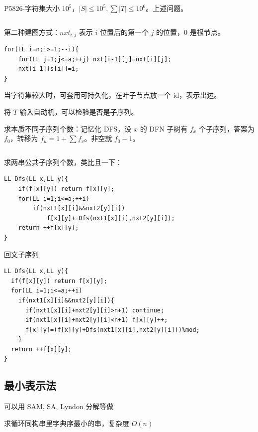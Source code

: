 \documentclass[twocolumn,10pt]{ctexart}
\begin{document}
\begin{notebox}
P5826-字符集大小 $10^5$，$|S|\le10^5,\sum |T|\le 10^6$。上述问题。
\end{notebox}

\inputminted{cpp}{code/p5826_seg_automaton.cpp}

第二种建图方式：$nxt_{i,j}$ 表示 $i$ 位置后的第一个 $j$ 的位置，$0$ 是根节点。

\begin{verbatim}
for(LL i=n;i>=1;--i){
    for(LL j=1;j<=a;++j) nxt[i-1][j]=nxt[i][j];
    nxt[i-1][s[i]]=i;
}
\end{verbatim}

\begin{notebox}
当字符集较大时，可套用可持久化，在叶子节点放一个 id，表示出边。
\end{notebox}

将 $T$ 输入自动机，可以检验是否是子序列。

求本质不同子序列个数：记忆化 DFS，设 $x$ 的 DFN 子树有 $f_x$ 个子序列，答案为 $f_0$，转移为 $f_u=1+\sum f_v$。非空就 $f_0-1$。

\inputminted{cpp}{code/lc940_seg_automaton.cpp}

求两串公共子序列个数，类比且一下：

\begin{verbatim}
LL Dfs(LL x,LL y){
    if(f[x][y]) return f[x][y];
    for(LL i=1;i<=a;++i)
        if(nxt1[x][i]&&nxt2[y][i])
            f[x][y]+=Dfs(nxt1[x][i],nxt2[y][i]);
    return ++f[x][y];
}
\end{verbatim}

回文子序列

\begin{verbatim}
LL Dfs(LL x,LL y){
  if(f[x][y]) return f[x][y];
  for(LL i=1;i<=a;++i)
    if(nxt1[x][i]&&nxt2[y][i]){
      if(nxt1[x][i]+nxt2[y][i]>n+1) continue;
      if(nxt1[x][i]+nxt2[y][i]<n+1) f[x][y]++;
      f[x][y]=(f[x][y]+Dfs(nxt1[x][i],nxt2[y][i]))%mod;
    }
  return ++f[x][y];
}
\end{verbatim}

\subsection{最小表示法}

\begin{notebox}
可以用 SAM, SA, Lyndon 分解等做
\end{notebox}

求循环同构串里字典序最小的串，复杂度 $O(n)$
\end{document}
